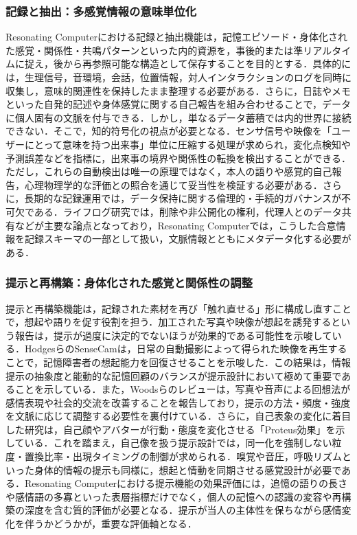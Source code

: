 \documentclass[originalpaper]{jsaiart}
\begin{document}
\subsubsection{記録と抽出：多感覚情報の意味単位化}
Resonating Computerにおける記録と抽出機能は，記憶エピソード・身体化された感覚・関係性・共鳴パターンといった内的資源を，事後的または準リアルタイムに捉え，後から再参照可能な構造として保存することを目的とする．具体的には，生理信号，音環境，会話，位置情報，対人インタラクションのログを同時に収集し，意味的関連性を保持したまま整理する必要がある\cite{ringeval2013,karkar2017}．さらに，日誌やメモといった自発的記述や身体感覚に関する自己報告を組み合わせることで，データに個人固有の文脈を付与できる\cite{li2010,epstein2015}．しかし，単なるデータ蓄積では内的世界に接続できない．そこで，知的符号化の視点が必要となる．センサ信号や映像を「ユーザーにとって意味を持つ出来事」単位に圧縮する処理が求められ，変化点検知や予測誤差などを指標に，出来事の境界や関係性の転換を検出することができる\cite{harashima1996}．ただし，これらの自動検出は唯一の原理ではなく，本人の語りや感覚的自己報告，心理物理学的な評価\cite{suzuki2004emg}との照合を通じて妥当性を検証する必要がある．さらに，長期的な記録運用では，データ保持に関する倫理的・手続的ガバナンスが不可欠である．ライフログ研究では，削除や非公開化の権利，代理人とのデータ共有などが主要な論点となっており\cite{sellen2010}，Resonating Computerでは，こうした合意情報を記録スキーマの一部として扱い，文脈情報とともにメタデータ化する必要がある．

\subsubsection{提示と再構築：身体化された感覚と関係性の調整}
提示と再構築機能は，記録された素材を再び「触れ直せる」形に構成し直すことで，想起や語りを促す役割を担う．加工された写真や映像が想起を誘発するという報告は，提示が過度に決定的でないほうが効果的である可能性を示唆している\cite{watanave2019}．HodgesらのSenseCam\cite{hodges2006}は，日常の自動撮影によって得られた映像を再生することで，記憶障害者の想起能力を回復させることを示唆した．この結果は，情報提示の抽象度と能動的な記憶回顧のバランスが提示設計において極めて重要であることを示している．また，Woodsらのレビュー\cite{woods2018}は，写真や音声による回想法が感情表現や社会的交流を改善することを報告しており，提示の方法・頻度・強度を文脈に応じて調整する必要性を裏付けている．さらに，自己表象の変化に着目した研究は，自己顔やアバターが行動・態度を変化させる「Proteus効果」を示している\cite{yee2007}．これを踏まえ，自己像を扱う提示設計では，同一化を強制しない粒度・置換比率・出現タイミングの制御が求められる．嗅覚や音圧，呼吸リズムといった身体的情報の提示も同様に，想起と情動を同期させる感覚設計が必要である\cite{casey2000,chaudhuri2014}．Resonating Computerにおける提示機能の効果評価には，追憶の語りの長さや感情語の多寡といった表層指標だけでなく，個人の記憶への認識の変容や再構築の深度を含む質的評価が必要となる．提示が当人の主体性を保ちながら感情変化を伴うかどうかが，重要な評価軸となる．
\end{document}

